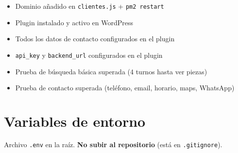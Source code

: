 \documentclass[12pt, a4paper]{article}
\begin{document}
\begin{tcolorbox}[colback=verdeclaro!50, colframe=verdeoscuro,
                  title={\small\bfseries Lista de verificación}]
\begin{itemize}[label=$\square$, noitemsep]
  \item Dominio añadido en \texttt{clientes.js} + \texttt{pm2 restart}
  \item Plugin instalado y activo en WordPress
  \item Todos los datos de contacto configurados en el plugin
  \item \texttt{api\_key} y \texttt{backend\_url} configurados en el plugin
  \item Prueba de búsqueda básica superada (4 turnos hasta ver piezas)
  \item Prueba de contacto superada (teléfono, email, horario, maps, WhatsApp)
\end{itemize}
\end{tcolorbox}

\section{Variables de entorno}

Archivo \texttt{.env} en la raíz. \textbf{No subir al repositorio} (está en \texttt{.gitignore}).
\end{document}
